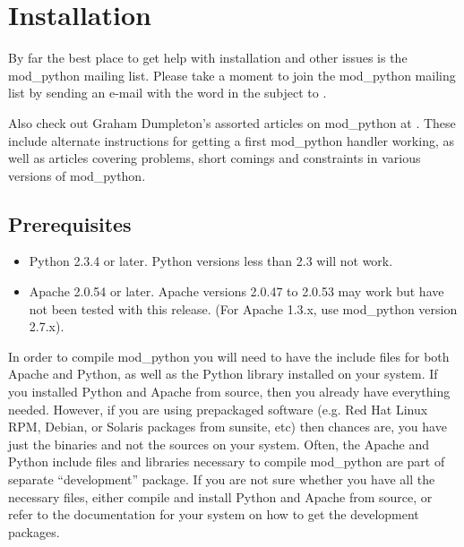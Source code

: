 \chapter{Installation\label{installation}}

\begin{notice}
  By far the best place to get help with installation and other issues
  is the mod_python mailing list. Please take a moment to join the
  mod_python mailing list by sending an e-mail with the word
   in the subject to
  .

  Also check out Graham Dumpleton's assorted articles on mod_python
  at .
  These include alternate instructions for getting a first mod_python
  handler working, as well as articles covering problems, short comings and
  constraints in various versions of mod_python.
\end{notice}

\section{Prerequisites\label{inst-prerequisites}}

\begin{itemize}
\item
  Python 2.3.4 or later. Python versions less than 2.3 will not work.
\item
  Apache 2.0.54 or later. Apache versions 2.0.47 to 2.0.53 may work
  but have not been tested with this release.
  (For Apache 1.3.x, use mod_python version 2.7.x).
\end{itemize}

In order to compile mod_python you will need to have the include files
for both Apache and Python, as well as the Python library installed on
your system.  If you installed Python and Apache from source, then you
already have everything needed. However, if you are using prepackaged
software (e.g. Red Hat Linux RPM, Debian, or Solaris packages from
sunsite, etc) then chances are, you have just the binaries and not the
sources on your system. Often, the Apache and Python include files and
libraries necessary to compile mod_python are part of separate
``development'' package. If you are not sure whether you have all the
necessary files, either compile and install Python and Apache from
source, or refer to the documentation for your system on how to get
the development packages.

